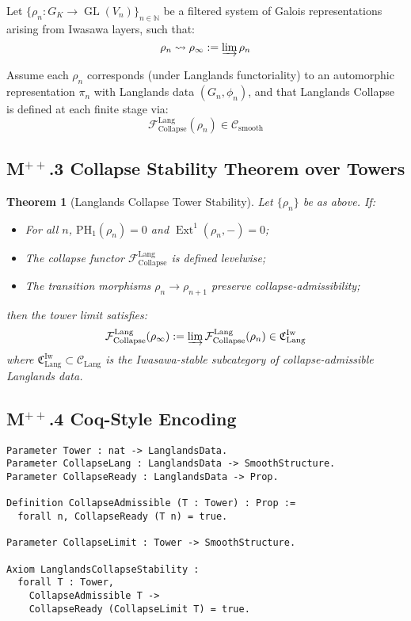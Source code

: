 \documentclass[11pt]{article}
\newtheorem{theorem}{Theorem}[section]
\DeclareMathOperator{\Ext}{Ext}
\DeclareMathOperator{\GL}{GL}
\begin{document}
Let $\{ \rho_n \colon G_K \to \GL(V_n) \}_{n \in \mathbb{N}}$ be a filtered system of Galois representations arising from Iwasawa layers, such that:
\[
\rho_n \rightsquigarrow \rho_\infty := \varinjlim \rho_n
\]

Assume each $\rho_n$ corresponds (under Langlands functoriality) to an automorphic representation $\pi_n$ with Langlands data $(G_n, \phi_n)$, and that Langlands Collapse is defined at each finite stage via:
\[
\mathcal{F}_{\mathrm{Collapse}}^{\mathrm{Lang}}(\rho_n) \in \mathcal{C}_{\mathrm{smooth}}
\]

\subsection*{M$^{++}$.3 Collapse Stability Theorem over Towers}

\begin{theorem}[Langlands Collapse Tower Stability]
Let $\{ \rho_n \}$ be as above. If:
\begin{itemize}
  \item[(i)] For all $n$, \( \mathrm{PH}_1(\rho_n) = 0 \) and \( \Ext^1(\rho_n, -) = 0 \);
  \item[(ii)] The collapse functor \( \mathcal{F}_{\mathrm{Collapse}}^{\mathrm{Lang}} \) is defined levelwise;
  \item[(iii)] The transition morphisms \( \rho_n \to \rho_{n+1} \) preserve collapse-admissibility;
\end{itemize}
then the tower limit satisfies:
\[
\mathcal{F}_{\mathrm{Collapse}}^{\mathrm{Lang}}(\rho_\infty) := \varinjlim \mathcal{F}_{\mathrm{Collapse}}^{\mathrm{Lang}}(\rho_n) \in \mathfrak{C}^{\mathrm{Iw}}_{\mathrm{Lang}}
\]
where \( \mathfrak{C}^{\mathrm{Iw}}_{\mathrm{Lang}} \subset \mathcal{C}_{\mathrm{Lang}} \) is the Iwasawa-stable subcategory of collapse-admissible Langlands data.
\end{theorem}

\subsection*{M$^{++}$.4 Coq-Style Encoding}

\begin{lstlisting}[language=Coq, caption=Langlands Collapse over Iwasawa Towers]
Parameter Tower : nat -> LanglandsData.
Parameter CollapseLang : LanglandsData -> SmoothStructure.
Parameter CollapseReady : LanglandsData -> Prop.

Definition CollapseAdmissible (T : Tower) : Prop :=
  forall n, CollapseReady (T n) = true.

Parameter CollapseLimit : Tower -> SmoothStructure.

Axiom LanglandsCollapseStability :
  forall T : Tower,
    CollapseAdmissible T ->
    CollapseReady (CollapseLimit T) = true.
\end{lstlisting}
\end{document}
